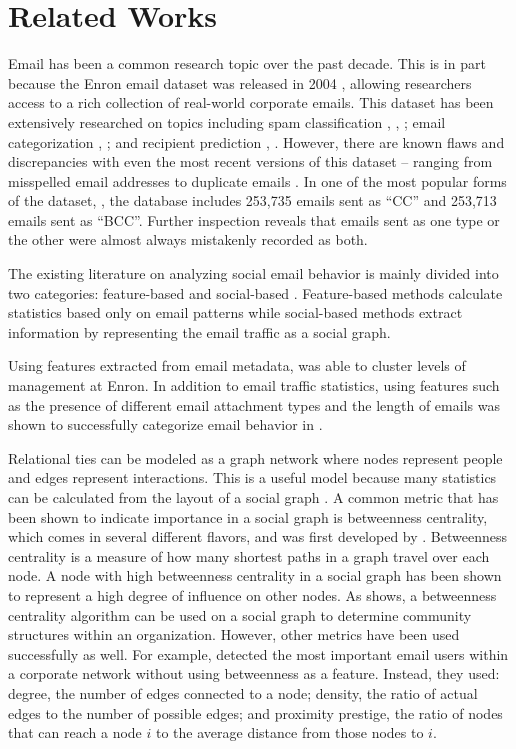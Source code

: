 \documentclass{article}
\begin{document}
\section{Related Works} \label{Related Works}
Email has been a common research topic over the past decade.  This is in part because  the Enron email dataset was released in 2004 \cite{klimt_introducing_2004}, allowing researchers access to a rich collection of real-world corporate emails.  This dataset has been extensively researched on topics including spam classification \cite{martin_analyzing_2005}, \cite{gaber_e-mail_2016}, \cite{shams_classifying_2013}; email categorization \cite{he_novel_2014}, \cite{keila_structure_2005}; and recipient prediction \cite{sofershtein_predicting_2015}, \cite{hu_towards_2012}.  However, there are known flaws and discrepancies with even the most recent versions of this dataset -- ranging from misspelled email addresses \cite{nordbo_data_2014} to duplicate emails \cite{waterman_big_2014}. In one of the most popular forms of the dataset, \cite{shetty_enron_2004}, the database includes 253,735 emails sent as ``CC'' and  253,713 emails sent as ``BCC''.  Further inspection reveals that emails sent as one type or the other were almost always mistakenly recorded as both.
\par
The existing literature on analyzing social email behavior is mainly divided into two categories: feature-based and social-based \cite{tang_email_2013}.  Feature-based methods calculate statistics based only on email patterns while social-based methods extract information by representing the email traffic as a social graph.
\par
Using features extracted from email metadata, \cite{yelupula_social_2008} was able to cluster levels of management at Enron. In addition to email traffic statistics, using features such as the presence of different email attachment types and the length of emails was shown to successfully categorize email behavior in \cite{martin_analyzing_2005}.
\par
Relational ties can be modeled as a graph network where nodes represent people and edges represent interactions.  This is a useful model because many statistics can be calculated from the layout of a social graph \cite{wasserman_social_1994}.  A common metric that has been shown to indicate importance in a social graph is betweenness centrality, which comes in several different flavors, and was first developed by \cite{freeman_set_1977}.  Betweenness centrality is a measure of how many shortest paths in a graph travel over each node.  A node with high betweenness centrality in a social graph has been shown to represent a high degree of influence on other nodes.  As \cite{tyler_email_2003} shows, a betweenness centrality algorithm can be used on a social graph to determine community structures within an organization.  However, other metrics have been used successfully as well.  For example, \cite{wilson_discovery_2009} detected the most important email users within a corporate network without using betweenness as a feature.  Instead, they used: degree, the number of edges connected to a node; density, the ratio of actual edges to the number of possible edges; and proximity prestige, the ratio of nodes that can reach a node $i$ to the average distance from those nodes to $i$.
\end{document}
